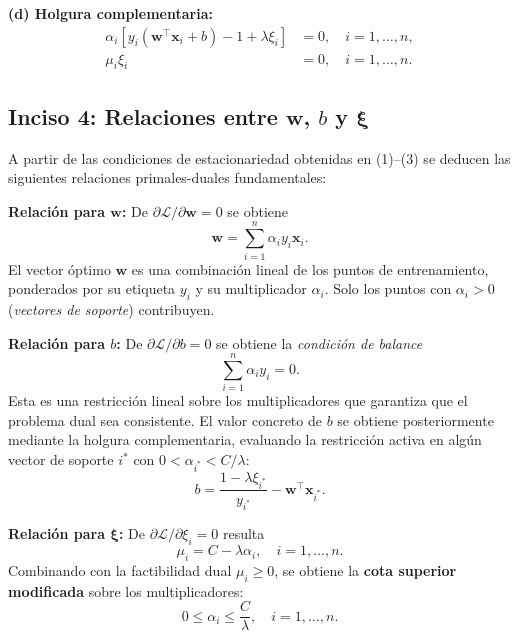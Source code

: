 \documentclass[spanish]{article}
\begin{document}
\textbf{(d) Holgura complementaria:}
\begin{align}
\alpha_i\!\left[y_i(\mathbf{w}^\top \mathbf{x}_i + b) - 1 + \lambda \xi_i\right] &= 0, \quad i=1,\dots,n,\\
\mu_i \xi_i &= 0, \quad i=1,\dots,n.
\end{align}

\subsection{Inciso 4: Relaciones entre $\mathbf{w}$, $b$ y $\boldsymbol{\xi}$}

A partir de las condiciones de estacionariedad obtenidas en (1)–(3) se deducen las siguientes relaciones primales-duales fundamentales:

\textbf{Relación para $\mathbf{w}$:} De $\partial \mathcal{L}/\partial \mathbf{w} = 0$ se obtiene
\begin{equation}
\boxed{\; \mathbf{w} = \sum_{i=1}^{n}\alpha_i y_i \mathbf{x}_i. \;}
\end{equation}
El vector óptimo $\mathbf{w}$ es una combinación lineal de los puntos de entrenamiento, ponderados por su etiqueta $y_i$ y su multiplicador $\alpha_i$. Solo los puntos con $\alpha_i > 0$ (\emph{vectores de soporte}) contribuyen.

\textbf{Relación para $b$:} De $\partial \mathcal{L}/\partial b = 0$ se obtiene la \emph{condición de balance}
\begin{equation}
\boxed{\; \sum_{i=1}^{n}\alpha_i y_i = 0. \;}
\end{equation}
Esta es una restricción lineal sobre los multiplicadores que garantiza que el problema dual sea consistente. El valor concreto de $b$ se obtiene posteriormente mediante la holgura complementaria, evaluando la restricción activa en algún vector de soporte $i^{*}$ con $0 < \alpha_{i^{*}} < C/\lambda$:
\[
b = \frac{1 - \lambda \xi_{i^{*}}}{y_{i^{*}}} - \mathbf{w}^\top \mathbf{x}_{i^{*}}.
\]

\textbf{Relación para $\boldsymbol{\xi}$:} De $\partial \mathcal{L}/\partial \xi_i = 0$ resulta
\begin{equation}
\boxed{\; \mu_i = C - \lambda \alpha_i, \quad i=1,\dots,n. \;}
\end{equation}
Combinando con la factibilidad dual $\mu_i \geq 0$, se obtiene la \textbf{cota superior modificada} sobre los multiplicadores:
\begin{equation}
\boxed{\; 0 \leq \alpha_i \leq \frac{C}{\lambda}, \quad i=1,\dots,n. \;}
\end{equation}
\end{document}
